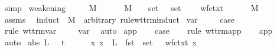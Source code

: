 \begin{isabellebody}
\ simp\isanewline
{}\isamarkupfalse%
%
\endisatagproof
{\isafoldproof}%
%
\isadelimproof
\isanewline
%
\endisadelimproof
\isanewline
{}\isamarkupfalse%
\ weakening{\isacharcolon}\isanewline
\ \ \ {\isasymGamma}\ {\isasymGamma}{\isacharprime}\ M\ {\isasymsigma}\isanewline
\ \ \ {\isachardoublequoteopen}{\isasymGamma}\ {\isasymturnstile}\ M\ {\isacharcolon}\ {\isasymsigma}{\isachardoublequoteclose}\ \ {\isachardoublequoteopen}set\ {\isasymGamma}\ {\isasymsubseteq}\ set\ {\isasymGamma}{\isacharprime}{\isachardoublequoteclose}\isanewline
\ \ \ {\isachardoublequoteopen}wf{\isacharunderscore}ctxt\ {\isasymGamma}{\isacharprime}{\isachardoublequoteclose}\isanewline
\ \ \ {\isachardoublequoteopen}{\isasymGamma}{\isacharprime}\ {\isasymturnstile}\ M\ {\isacharcolon}\ {\isasymsigma}{\isachardoublequoteclose}\isanewline
%
\isadelimproof
%
\endisadelimproof
%
\isatagproof
{}\isamarkupfalse%
\ assms\ \isamarkupfalse%
\ {\isacharparenleft}induct\ {\isasymGamma}\ M\ {\isasymsigma}\ arbitrary{\isacharcolon}{\isasymGamma}{\isacharprime}\ rule{\isacharcolon}wt{\isacharunderscore}trm{\isachardot}induct{\isacharparenright}\isanewline
{}\isamarkupfalse%
\ var\ \isanewline
\ \ \isamarkupfalse%
\ {\isacharquery}case\ \isanewline
\ \ \isamarkupfalse%
\ {\isacharparenleft}rule\ wt{\isacharunderscore}trm{\isachardot}var{\isacharparenright}\ \isanewline
\ \ \isamarkupfalse%
\ var\ \isamarkupfalse%
\ auto\isanewline
{}\isamarkupfalse%
\isanewline
{}\isamarkupfalse%
\ app\isanewline
\ \ \isamarkupfalse%
\ {\isacharquery}case\isanewline
\ \ \isamarkupfalse%
\ {\isacharparenleft}rule\ wt{\isacharunderscore}trm{\isachardot}app{\isacharparenright}\isanewline
\ \ \isamarkupfalse%
\ app\ \isamarkupfalse%
\ auto\isanewline
{}\isamarkupfalse%
\isanewline
{}\isamarkupfalse%
\ {\isacharparenleft}abs\ L\ {\isasymsigma}\ {\isasymGamma}\ t\ {\isasymtau}{\isacharparenright}\isanewline
\ \ \isamarkupfalse%
\ {}{\isacharcolon}\ {\isachardoublequoteopen}{\isasymAnd}x{\isachardot}\ x\ {\isasymnotin}\ {\isacharparenleft}L\ {\isasymunion}\ fst\ {\isacharbackquote}\ set\ {\isasymGamma}{\isacharprime}{\isacharparenright}\ {\isasymLongrightarrow}\ wf{\isacharunderscore}ctxt\ {\isacharparenleft}{\isacharparenleft}x{\isacharcomma}\ {\isasymsigma}{\isacharparenright}\ {\isacharhash}\ {\isasymGamma}{\isacharprime}{\isacharparenright}{\isachardoublequoteclose}\isanewline

\end{isabellebody}
